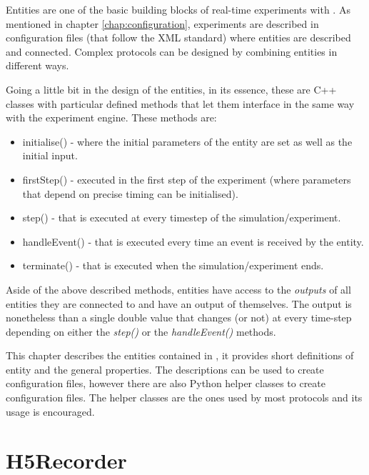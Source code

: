 
Entities are one of the basic building blocks of real-time experiments with \progname. As mentioned in chapter \ref{chap:configuration}, experiments are described in configuration files (that follow the XML standard) where entities are described and connected. Complex protocols can be designed by combining entities in different ways. 

Going a little bit in the design of the entities, in its essence, these are C++ classes with particular defined methods that let them interface in the same way with the experiment engine. These methods are:
\begin{itemize}
	\item{initialise()} - where the initial parameters of the entity are set as well as the initial input.
	\item{firstStep()} - executed in the first step of the experiment (where parameters that depend on precise timing can be initialised).
	\item{step()} - that is executed at every timestep of the simulation/experiment.
	\item{handleEvent()} - that is executed every time an event is received by the entity.
	\item{terminate()} - that is executed when the simulation/experiment ends. 
\end{itemize}
Aside of the above described methods, entities have access to the \emph{outputs} of  all entities they are connected to and have an output of themselves. The output is nonetheless than a single double value that changes (or not) at every time-step depending on either the \emph{step()} or the \emph{handleEvent()} methods. 

This chapter describes the entities contained in \progname, it provides short definitions of entity and the general properties. The descriptions can be used to create configuration files, however there are also Python helper classes to create configuration files. The helper classes are the ones used by most protocols and its usage is encouraged.

\section{H5Recorder}\label{entity:H5Recorder}


